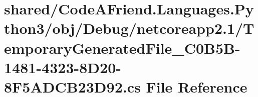 \hypertarget{shared_2_code_a_friend_8_languages_8_python3_2obj_2_debug_2netcoreapp2_81_2_temporary_generated_bd1de4e5bc0b3d0c72efc3b82d6434c6}{}\section{shared/\+Code\+A\+Friend.Languages.\+Python3/obj/\+Debug/netcoreapp2.1/\+Temporary\+Generated\+File\+\_\+C0\+B5\+B-\/1481-\/4323-\/8\+D20-\/8\+F5\+A\+D\+C\+B23\+D92.cs File Reference}
\label{shared_2_code_a_friend_8_languages_8_python3_2obj_2_debug_2netcoreapp2_81_2_temporary_generated_bd1de4e5bc0b3d0c72efc3b82d6434c6}
